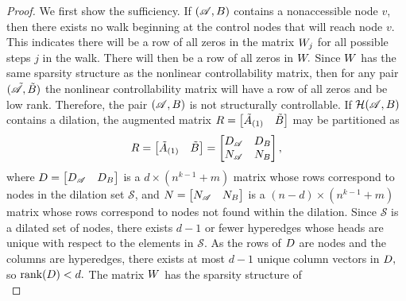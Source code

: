 \documentclass[10pt,a4paper]{amsart}
\newcommand{\Hs}{\mathcal{H}}
\newcommand{\Ss}{\mathcal{S}}
\newcommand{\rank}{\text{rank}}
\begin{document}
\begin{proof}
    We first show the sufficiency.
    If $(\mathscr A,\textbf B)$ contains a nonaccessible node $v$, then there exists no walk beginning at the control nodes that will reach node $v$.
    This indicates there will be a row of all zeros in the matrix $\textbf W_j$ for all possible steps $j$ in the walk.
    There will then be a row of all zeros in $\textbf W.$
    Since $\textbf W$ has the same sparsity structure as the nonlinear controllability matrix, then for any pair $(\tilde{\mathscr A},\tilde{\textbf B})$ the nonlinear controllability matrix will have a row of all zeros and be low rank.
    Therefore, the pair $(\mathscr A,\textbf B)$ is not structurally controllable.
If $\Hs(\mathscr A,\textbf B)$ contains a dilation, the augmented matrix $\textbf R=\begin{bmatrix}
        \tilde{\textbf A}_{(1)}&\tilde{\textbf B}
    \end{bmatrix}$ may be partitioned as
    \begin{equation*}
        \textbf R=\begin{bmatrix}
            \tilde{\textbf A}_{(1)}&\tilde{\textbf B}    \end{bmatrix}=\begin{bmatrix}
            \textbf D_\mathscr A&\textbf D_{\textbf B}\\ \textbf N_\mathscr A&\textbf N_\textbf B
        \end{bmatrix},
    \end{equation*}
    where $\textbf D=\begin{bmatrix}
        \textbf D_\mathscr A&\textbf D_\textbf B
    \end{bmatrix}$ is a $d\times (n^{k-1}+m)$ matrix whose rows correspond to nodes in the dilation set $\Ss$, and $\textbf N=\begin{bmatrix}
        \textbf N_\mathscr A&\textbf N_\textbf B
    \end{bmatrix}$ is a $(n-d)\times (n^{k-1}+m)$ matrix whose rows correspond to nodes not found within the dilation.
    Since $\Ss$ is a dilated set of nodes, there exists $d-1$ or fewer hyperedges whose heads are unique with respect to the elements in $\Ss.$
    As the rows of $\textbf D$ are nodes and the columns are hyperedges, there exists at most $d-1$ unique column vectors in $\textbf D,$ so $\rank(\textbf D)<d.$
    The matrix $\textbf W$ has the sparsity structure of
    \begin{equation*}

\end{equation*}
\end{proof}
\end{document}
